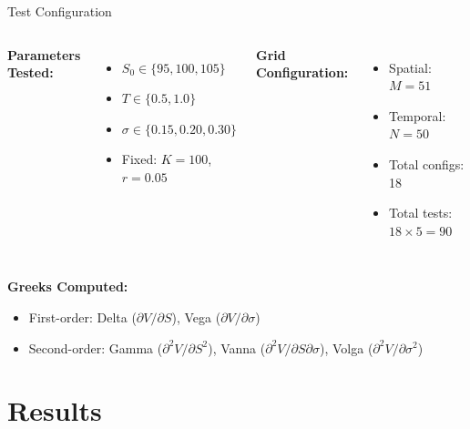\documentclass[aspectratio=169]{beamer}
\begin{document}
\begin{frame}{Test Configuration}
\begin{columns}
\textbf{Parameters Tested:}
\begin{itemize}
    \item $S_0 \in \{95, 100, 105\}$
    \item $T \in \{0.5, 1.0\}$
    \item $\sigma \in \{0.15, 0.20, 0.30\}$
    \item Fixed: $K=100$, $r=0.05$
\end{itemize}

\textbf{Grid Configuration:}
\begin{itemize}
    \item Spatial: $M = 51$
    \item Temporal: $N = 50$
    \item Total configs: 18
    \item Total tests: $18 \times 5 = 90$
\end{itemize}
\end{columns}

\vspace{1em}
\textbf{Greeks Computed:}
\begin{itemize}
    \item First-order: Delta ($\partial V/\partial S$), Vega ($\partial V/\partial\sigma$)
    \item Second-order: Gamma ($\partial^2 V/\partial S^2$), Vanna ($\partial^2 V/\partial S\partial\sigma$), Volga ($\partial^2 V/\partial\sigma^2$)
\end{itemize}
\end{frame}

\section{Results}
\end{document}
